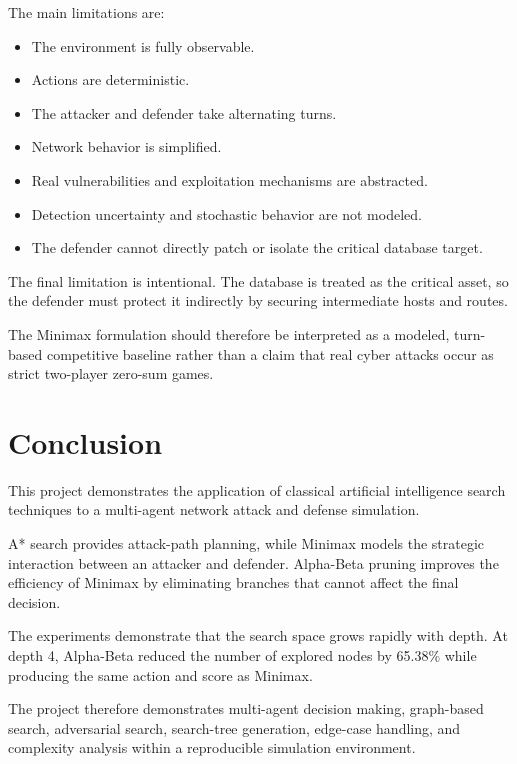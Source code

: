 \documentclass[12pt,a4paper]{article}
\begin{document}
The main limitations are:

\begin{itemize}
    \item The environment is fully observable.
    \item Actions are deterministic.
    \item The attacker and defender take alternating turns.
    \item Network behavior is simplified.
    \item Real vulnerabilities and exploitation mechanisms are abstracted.
    \item Detection uncertainty and stochastic behavior are not modeled.
    \item The defender cannot directly patch or isolate the critical database
    target.
\end{itemize}

The final limitation is intentional. The database is treated as the critical
asset, so the defender must protect it indirectly by securing intermediate
hosts and routes.

The Minimax formulation should therefore be interpreted as a modeled,
turn-based competitive baseline rather than a claim that real cyber
attacks occur as strict two-player zero-sum games.


\section{Conclusion}

This project demonstrates the application of classical artificial
intelligence search techniques to a multi-agent network attack and defense
simulation.

A* search provides attack-path planning, while Minimax models the strategic
interaction between an attacker and defender. Alpha-Beta pruning improves the
efficiency of Minimax by eliminating branches that cannot affect the final
decision.

The experiments demonstrate that the search space grows rapidly with depth.
At depth 4, Alpha-Beta reduced the number of explored nodes by 65.38\% while
producing the same action and score as Minimax.

The project therefore demonstrates multi-agent decision making, graph-based
search, adversarial search, search-tree generation, edge-case handling, and
complexity analysis within a reproducible simulation environment.
\end{document}
